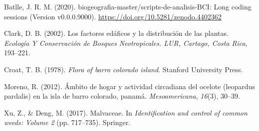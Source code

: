 \documentclass[11pt,]{article}
\begin{document}
\hypertarget{refs}{}
\hypertarget{ref-jose_ramon_martinez_batlle_2020_4402362}{}
Batlle, J. R. M. (2020). biogeografia-master/scripts-de-analisis-BCI:
Long coding sessions (Version v0.0.0.9000).
\url{https://doi.org/10.5281/zenodo.4402362}

\hypertarget{ref-clark2002factores}{}
Clark, D. B. (2002). Los factores edáficos y la distribución de las
plantas. \emph{Ecología Y Conservación de Bosques Neotropicales. LUR,
Cartago, Costa Rica}, 193--221.

\hypertarget{ref-croat1978flora}{}
Croat, T. B. (1978). \emph{Flora of barro colorado island}. Stanford
University Press.

\hypertarget{ref-moreno2012ambito}{}
Moreno, R. (2012). Ámbito de hogar y actividad circadiana del ocelote
(leopardus pardalis) en la isla de barro colorado, panamá.
\emph{Mesoamericana}, \emph{16}(3), 30--39.

\hypertarget{ref-xu2017malvaceae}{}
Xu, Z., \& Deng, M. (2017). Malvaceae. In \emph{Identification and
control of common weeds: Volume 2} (pp. 717--735). Springer.




\newpage
\singlespacing 
\end{document}
